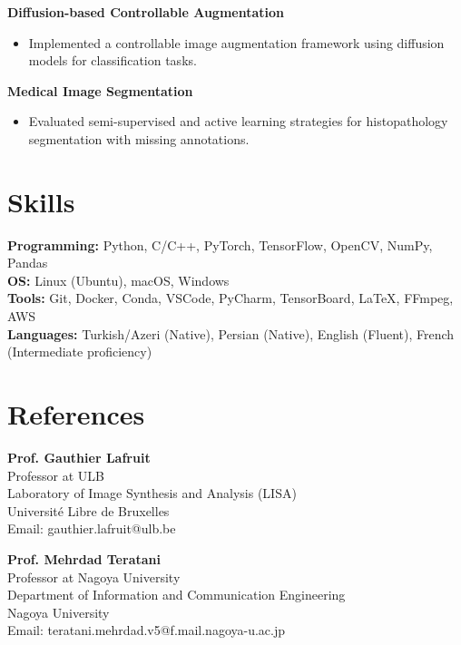 \documentclass[11pt,a4paper]{article}
\begin{document}
\textbf{Diffusion-based Controllable Augmentation}
\begin{itemize}
    \item Implemented a controllable image augmentation framework using diffusion models for classification tasks.
\end{itemize}

\textbf{Medical Image Segmentation}
\begin{itemize}
    \item Evaluated semi-supervised and active learning strategies for histopathology segmentation with missing annotations.
\end{itemize}

\section*{Skills}
\textbf{Programming:} Python, C/C++, PyTorch, TensorFlow, OpenCV, NumPy, Pandas\\
\textbf{OS:} Linux (Ubuntu), macOS, Windows  \\
\textbf{Tools:} Git, Docker, Conda, VSCode, PyCharm, TensorBoard, LaTeX, FFmpeg, AWS  \\
\textbf{Languages:} Turkish/Azeri (Native), Persian (Native), English (Fluent), French (Intermediate proficiency) \\

\section*{References}

\begin{minipage}[t]{0.48\textwidth}
    \textbf{Prof. Gauthier Lafruit} \\
    Professor at ULB \\
    Laboratory of Image Synthesis and Analysis (LISA) \\
    Université Libre de Bruxelles \\
    Email: gauthier.lafruit@ulb.be
\end{minipage}%
\hfill
\begin{minipage}[t]{0.48\textwidth}
    \textbf{Prof. Mehrdad Teratani} \\
    Professor at Nagoya University \\
    Department of Information and Communication Engineering \\
    Nagoya University \\
    Email: teratani.mehrdad.v5@f.mail.nagoya-u.ac.jp
\end{minipage}
\end{document}
